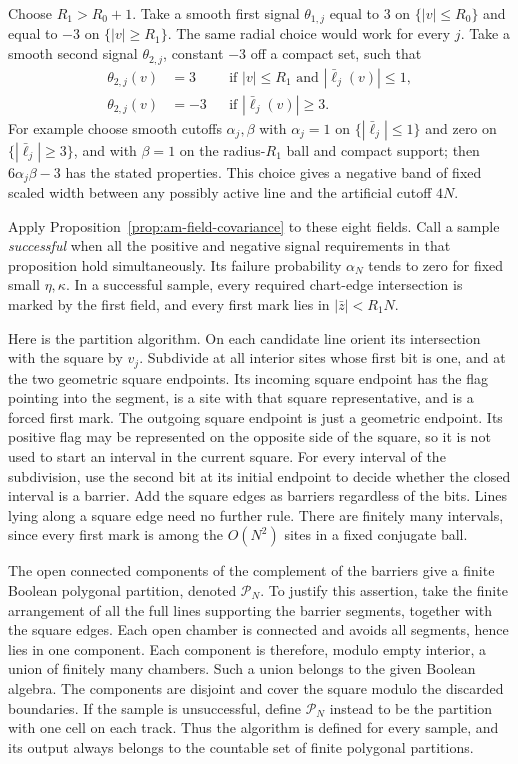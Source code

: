 Choose $R_1>R_0+1$.  Take a smooth first signal $\theta_{1,j}$ equal to
$3$ on $\{|v|\le R_0\}$ and equal to $-3$ on
$\{|v|\ge R_1\}$.  The same radial choice would work for every $j$.
Take a smooth second signal $\theta_{2,j}$, constant $-3$ off a compact
set, such that
\begin{align}
 \theta_{2,j}(v)&=3
    &&\text{if } |v|\le R_1
          \text{ and }|\bar\ell_j(v)|\le1,
       \label{eq:am-positive-core}\\
 \theta_{2,j}(v)&=-3
    &&\text{if }|\bar\ell_j(v)|\ge3.
       \label{eq:am-negative-band}
\end{align}
For example choose smooth cutoffs $\alpha_j,\beta$ with
$\alpha_j=1$ on $\{|\bar\ell_j|\le1\}$ and zero on
$\{|\bar\ell_j|\ge3\}$, and with $\beta=1$ on the radius-$R_1$ ball
and compact support; then $6\alpha_j\beta-3$ has the stated properties.
This choice gives a negative band of fixed scaled width between any
possibly active line and the artificial cutoff $4N$.

Apply Proposition~\ref{prop:am-field-covariance} to these eight fields.
Call a sample \emph{successful} when all the positive and negative signal
requirements in that proposition hold simultaneously.  Its failure
probability $\alpha_N$ tends to zero for fixed small $\eta,\kappa$.
In a successful sample, every required chart-edge intersection is marked
by the first field, and every first mark lies in $|\bar z|<R_1N$.

Here is the partition algorithm.  On each candidate line orient its
intersection with the square by $v_j$.  Subdivide at all interior sites
whose first bit is one, and at the two geometric square endpoints.  Its
incoming square endpoint has the flag pointing into the segment, is a
site with that square representative, and is a forced first mark.  The
outgoing square endpoint is just a geometric endpoint.  Its positive
flag may be represented on the opposite side of the square, so it is not
used to start an interval in the current square.  For every interval of
the subdivision, use the second bit at its initial endpoint to decide
whether the closed interval is a barrier.  Add the square edges as barriers
regardless of the bits.  Lines lying along a square edge need
no further rule.  There are finitely many intervals, since every first
mark is among the $O(N^2)$ sites in a fixed conjugate ball.

The open connected components of the complement of the barriers give a
finite Boolean polygonal partition, denoted $\mathcal P_N$.  To justify
this assertion, take the finite arrangement of all the full lines supporting
the barrier segments, together with the square edges.  Each open chamber
is connected and avoids all segments, hence lies in one component.  Each
component is therefore, modulo empty interior, a union of finitely many
chambers.  Such a union belongs to the given Boolean algebra.  The
components are disjoint and cover the square modulo the discarded boundaries.
If the sample is unsuccessful, define $\mathcal P_N$ instead to be the
partition with one cell on each track.  Thus the algorithm is defined for
every sample, and its output always belongs to the countable set of finite
polygonal partitions.

